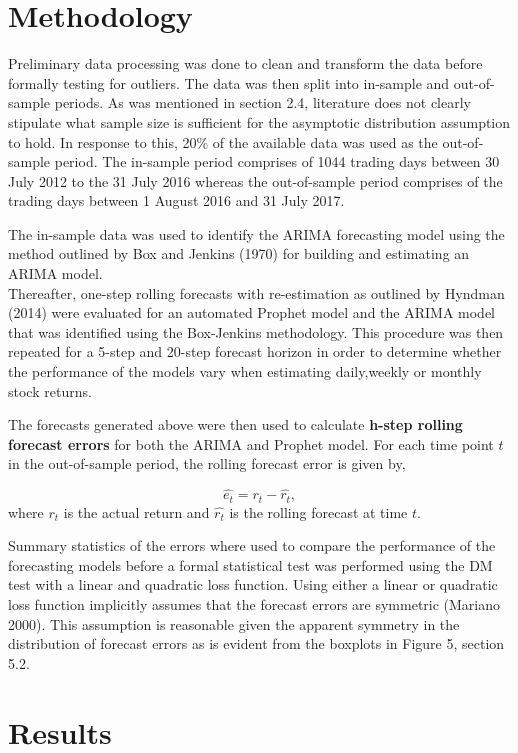 \documentclass[12pt,a4paper]{article}
\numberwithin{equation}{section}
\numberwithin{figure}{section}
\numberwithin{table}{section}
\begin{document}
\section{Methodology}\label{methodology}

Preliminary data processing was done to clean and transform the data
before formally testing for outliers. The data was then split into
in-sample and out-of-sample periods. As was mentioned in section 2.4,
literature does not clearly stipulate what sample size is sufficient for
the asymptotic distribution assumption to hold. In response to this,
20\% of the available data was used as the out-of-sample period. The
in-sample period comprises of 1044 trading days between 30 July 2012 to
the 31 July 2016 whereas the out-of-sample period comprises of the
trading days between 1 August 2016 and 31 July 2017.

The in-sample data was used to identify the ARIMA forecasting model
using the method outlined by Box and Jenkins (1970) for building and
estimating an ARIMA model.\\
Thereafter, one-step rolling forecasts with re-estimation as outlined by
Hyndman (2014) were evaluated for an automated Prophet model and the
ARIMA model that was identified using the Box-Jenkins methodology. This
procedure was then repeated for a 5-step and 20-step forecast horizon in
order to determine whether the performance of the models vary when
estimating daily,weekly or monthly stock returns.

The forecasts generated above were then used to calculate \textbf{h-step
rolling forecast errors} for both the ARIMA and Prophet model. For each
time point \(t\) in the out-of-sample period, the rolling forecast error
is given by,

\[ \hat{e_t} = r_t - \hat{r_t},\] where \(r_t\) is the actual return and
\(\hat{r_t}\) is the rolling forecast at time \(t\).

Summary statistics of the errors where used to compare the performance
of the forecasting models before a formal statistical test was performed
using the DM test with a linear and quadratic loss function. Using
either a linear or quadratic loss function implicitly assumes that the
forecast errors are symmetric (Mariano 2000). This assumption is
reasonable given the apparent symmetry in the distribution of forecast
errors as is evident from the boxplots in Figure 5, section 5.2.

\section{Results}\label{results}
\end{document}
